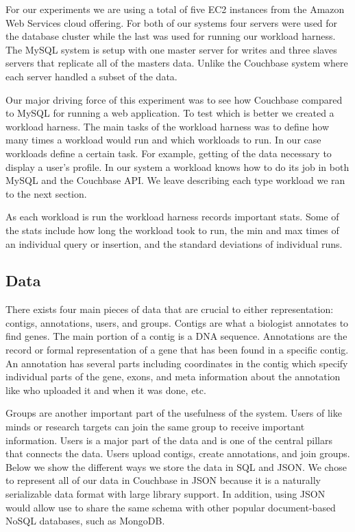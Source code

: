 \documentclass[10pt, conference, compsocconf]{IEEEtran}
\begin{document}
For our experiments we are using a total of five EC2 instances from the Amazon
Web Services cloud offering. For both of our systems four servers were used for the
database cluster while the last was used for running our workload harness. The MySQL
system is setup with one master server for writes and three slaves servers that
replicate all of the masters data. Unlike the Couchbase system where each
server handled a subset of the data.

Our major driving force of this experiment was to see how Couchbase compared to
MySQL for running a web application. To test which is better we created a
workload harness. The main tasks of the workload harness was to define how many
times a workload would run and which workloads to run. In our case workloads
define a certain task. For example, getting of the data necessary to display a
user's profile. In our system a workload knows how to do its job in both MySQL
and the Couchbase API. We leave describing each type workload we ran to the
next section.

As each workload is run the workload harness records important stats. Some of
the stats include how long the workload took to run, the min and max times of
an individual query or insertion, and the standard deviations of individual
runs.

\subsection{Data}
There exists four main pieces of data that are crucial to either
representation: contigs, annotations, users, and groups. Contigs are
what a biologist annotates to find genes. The main portion of a contig is a DNA
sequence. Annotations are the record or formal representation of a gene that
has been found in a specific contig. An annotation has several parts including
coordinates in the contig which specify individual parts of the gene, exons, and meta information
about the annotation like who uploaded it and when it was done, etc.

Groups are another important part of the usefulness of the system. Users of
like minds or research targets can join the same group to receive important information. Users is a
major part of the data and is one of the central pillars that connects the
data. Users upload contigs, create annotations, and join groups. Below we show
the different ways we store the data in SQL and JSON. We chose to represent all of our
data in Couchbase in JSON because it is a naturally serializable data format with
large library support. In addition, using JSON would allow use to share the same
schema with other popular document-based NoSQL databases, such as MongoDB.
\end{document}
